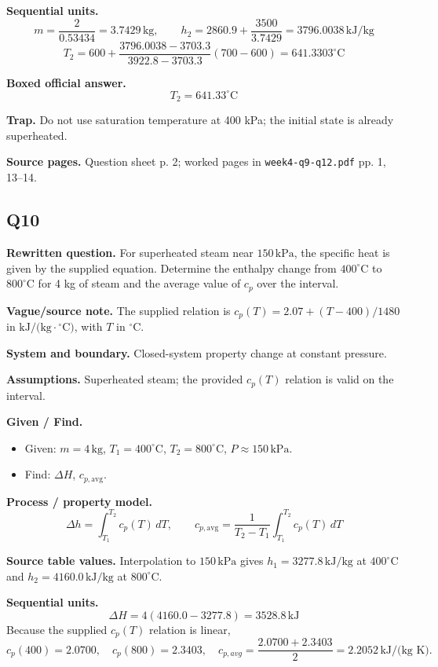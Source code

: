 \textbf{Sequential units.}
\[
 m=\frac{2}{0.53434}=3.7429\,\text{kg},\qquad h_2=2860.9+\frac{3500}{3.7429}=3796.0038\,\text{kJ/kg}
\]
\[
 T_2=600+\frac{3796.0038-3703.3}{3922.8-3703.3}(700-600)=641.3303^\circ\text{C}
\]

\textbf{Boxed official answer.}
\[\boxed{T_2=641.33^\circ\text{C}}\]

\textbf{Trap.} Do not use saturation temperature at 400 kPa; the initial state is already superheated.

\textbf{Source pages.} Question sheet p. 2; worked pages in \texttt{week4-q9-q12.pdf} pp. 1, 13--14.

\subsection*{Q10}
\textbf{Rewritten question.} For superheated steam near $150\,\text{kPa}$, the specific heat is given by the supplied equation. Determine the enthalpy change from $400^\circ\text{C}$ to $800^\circ\text{C}$ for 4 kg of steam and the average value of $c_p$ over the interval.

\textbf{Vague/source note.} The supplied relation is $c_p(T)=2.07+(T-400)/1480$ in $\text{kJ/(kg}\cdot{}^\circ\text{C)}$, with $T$ in $^\circ\text{C}$.

\textbf{System and boundary.} Closed-system property change at constant pressure.

\textbf{Assumptions.} Superheated steam; the provided $c_p(T)$ relation is valid on the interval.

\textbf{Given / Find.}
\begin{itemize}
  \item Given: $m=4\,\text{kg}$, $T_1=400^\circ\text{C}$, $T_2=800^\circ\text{C}$, $P\approx 150\,\text{kPa}$.
  \item Find: $\Delta H$, $c_{p,\text{avg}}$.
\end{itemize}

\textbf{Process / property model.}
\[
\Delta h=\int_{T_1}^{T_2} c_p(T)\,dT,\qquad c_{p,\text{avg}}=\frac{1}{T_2-T_1}\int_{T_1}^{T_2} c_p(T)\,dT
\]

\textbf{Source table values.} Interpolation to $150\,\text{kPa}$ gives $h_1=3277.8\,\text{kJ/kg}$ at $400^\circ\text{C}$ and $h_2=4160.0\,\text{kJ/kg}$ at $800^\circ\text{C}$.

\textbf{Sequential units.}
\[
 \Delta H=4(4160.0-3277.8)=3528.8\,\text{kJ}
\]
Because the supplied $c_p(T)$ relation is linear,
\[
 c_p(400)=2.0700,\quad c_p(800)=2.3403,\quad c_{p,avg}=\frac{2.0700+2.3403}{2}=2.2052\,\text{kJ/(kg K)}.
\]

